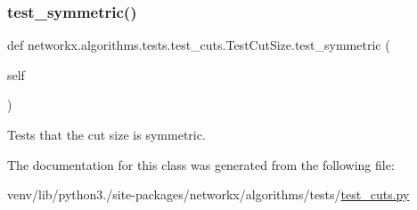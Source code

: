 \subsubsection{\texorpdfstring{test\+\_\+symmetric()}{test\_symmetric()}}
{\footnotesize\ttfamily def networkx.\+algorithms.\+tests.\+test\+\_\+cuts.\+Test\+Cut\+Size.\+test\+\_\+symmetric (\begin{DoxyParamCaption}\item[{}]{self }\end{DoxyParamCaption})}

\begin{DoxyVerb}Tests that the cut size is symmetric.\end{DoxyVerb}
 

The documentation for this class was generated from the following file\+:\begin{DoxyCompactItemize}
\item 
venv/lib/python3./site-\/packages/networkx/algorithms/tests/\hyperlink{tests_2test__cuts_8py}{test\+\_\+cuts.\+py}\end{DoxyCompactItemize}
